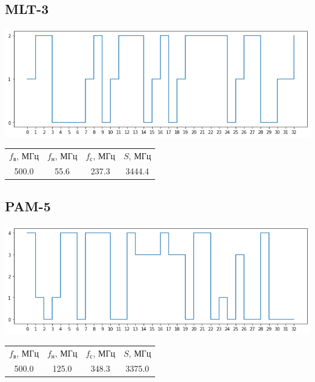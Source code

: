 \subsection{MLT-3}
\includegraphics[width=\textwidth]{1mlt3}
\begin{center}
    \begin{tabular}{cccc}
        $f_\mathrm{\text{в}}$, МГц & $f_\mathrm{\text{н}}$, МГц & $f_\mathrm{\text{с}}$, МГц & $S$, МГц \\
        500.0 & 55.6 & 237.3 & 3444.4 \\
    \end{tabular}
\end{center}

\subsection{PAM-5}
\includegraphics[width=\textwidth]{1pam5}
\begin{center}
    \begin{tabular}{cccc}
        $f_\mathrm{\text{в}}$, МГц & $f_\mathrm{\text{н}}$, МГц & $f_\mathrm{\text{с}}$, МГц & $S$, МГц \\
        500.0 & 125.0 & 348.3 & 3375.0 \\
    \end{tabular}
\end{center}

